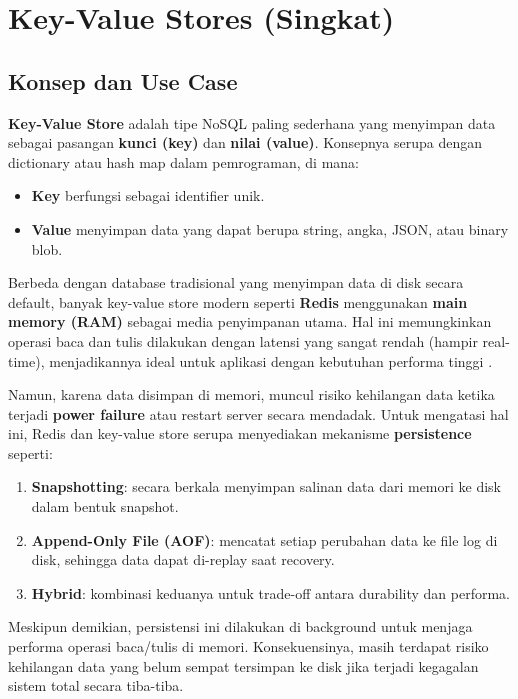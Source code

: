 \section{Key-Value Stores (Singkat)}

\subsection{Konsep dan Use Case}

\textbf{Key-Value Store} adalah tipe NoSQL paling sederhana yang menyimpan data sebagai pasangan \textbf{kunci (key)} dan \textbf{nilai (value)}. Konsepnya serupa dengan dictionary atau hash map dalam pemrograman, di mana:
\begin{itemize}
	\item \textbf{Key} berfungsi sebagai identifier unik.
	\item \textbf{Value} menyimpan data yang dapat berupa string, angka, JSON, atau binary blob.
\end{itemize}

Berbeda dengan database tradisional yang menyimpan data di disk secara default, banyak key-value store modern seperti \textbf{Redis} menggunakan \textbf{main memory (RAM)} sebagai media penyimpanan utama. Hal ini memungkinkan operasi baca dan tulis dilakukan dengan latensi yang sangat rendah (hampir real-time), menjadikannya ideal untuk aplikasi dengan kebutuhan performa tinggi \cite{moniruzzaman2013nosql}.

Namun, karena data disimpan di memori, muncul risiko kehilangan data ketika terjadi \textbf{power failure} atau restart server secara mendadak. Untuk mengatasi hal ini, Redis dan key-value store serupa menyediakan mekanisme \textbf{persistence} seperti:
\begin{enumerate}
	\item \textbf{Snapshotting}: secara berkala menyimpan salinan data dari memori ke disk dalam bentuk snapshot.
	\item \textbf{Append-Only File (AOF)}: mencatat setiap perubahan data ke file log di disk, sehingga data dapat di-replay saat recovery.
	\item \textbf{Hybrid}: kombinasi keduanya untuk trade-off antara durability dan performa.
\end{enumerate}

Meskipun demikian, persistensi ini dilakukan di background untuk menjaga performa operasi baca/tulis di memori. Konsekuensinya, masih terdapat risiko kehilangan data yang belum sempat tersimpan ke disk jika terjadi kegagalan sistem total secara tiba-tiba.

